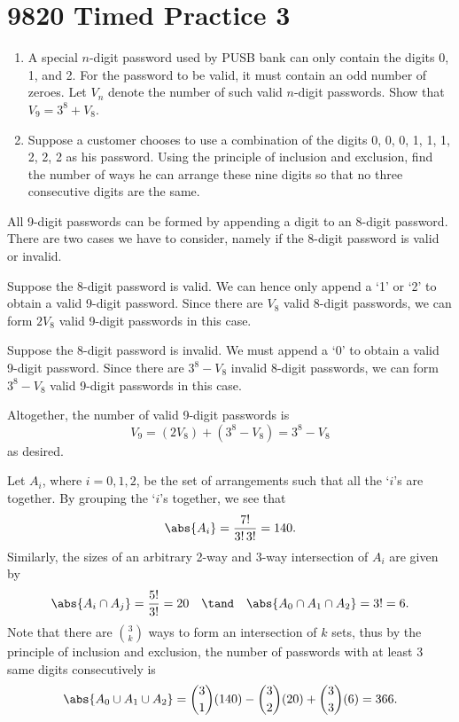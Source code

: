 \section{9820 Timed Practice 3}

\begin{problem}
    \begin{enumerate}
        \item A special $n$-digit password used by PUSB bank can only contain the digits 0, 1, and 2. For the password to be valid, it must contain an odd number of zeroes. Let $V_n$ denote the number of such valid $n$-digit passwords. Show that $V_9 = 3^8 + V_8$.
        \item Suppose a customer chooses to use a combination of the digits 0, 0, 0, 1, 1, 1, 2, 2, 2 as his password. Using the principle of inclusion and exclusion, find the number of ways he can arrange these nine digits so that no three consecutive digits are the same.
    \end{enumerate}
\end{problem}
\begin{solution}
    \begin{ppart}
        All 9-digit passwords can be formed by appending a digit to an 8-digit password. There are two cases we have to consider, namely if the 8-digit password is valid or invalid.

         Suppose the 8-digit password is valid. We can hence only append a `1' or `2' to obtain a valid 9-digit password. Since there are $V_8$ valid 8-digit passwords, we can form $2 V_8$ valid 9-digit passwords in this case.

         Suppose the 8-digit password is invalid. We must append a `0' to obtain a valid 9-digit password. Since there are $3^8 - V_8$ invalid 8-digit passwords, we can form $3^8 - V_8$ valid 9-digit passwords in this case.

        Altogether, the number of valid 9-digit passwords is \[V_9 = (2V_8) + (3^8 - V_8) = 3^8 - V_8\] as desired.
    \end{ppart}
    \begin{ppart}
        Let $A_i$, where $i = 0, 1, 2$, be the set of arrangements such that all the `$i$'s are together. By grouping the `$i$'s together, we see that \[\abs{A_i} = \frac{7!}{3! \, 3!} = 140.\] Similarly, the sizes of an arbitrary 2-way and 3-way intersection of $A_i$ are given by \[\abs{A_i \cap A_j} = \frac{5!}{3!} = 20 \quad \tand \quad \abs{A_0 \cap A_1 \cap A_2} = 3! = 6.\] Note that there are $\binom{3}{k}$ ways to form an intersection of $k$ sets, thus by the principle of inclusion and exclusion, the number of passwords with at least 3 same digits consecutively is \[\abs{A_0 \cup A_1 \cup A_2} = \binom{3}{1} (140) - \binom{3}{2} (20) + \binom{3}{3} (6) = 366.\]
    \end{ppart}
\end{solution}

